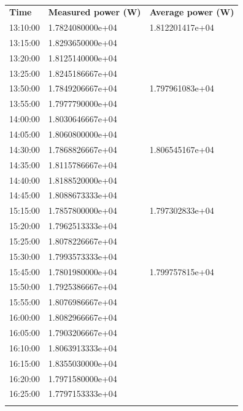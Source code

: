 \begin{table}
  \begin{center}
    \caption{}
    \label{tab:3}
    \begin{tabular}{lll}
      \hline\noalign{\smallskip}
      \textbf{Time} & \textbf{Measured power (W)} & \textbf{Average power (W)}  \\
      \noalign{\smallskip}\hline\noalign{\smallskip}
       13:10:00 & 1.7824080000e+04 & 1.812201417e+04 \\ 
       13:15:00 & 1.8293650000e+04 &  \\ 
       13:20:00 & 1.8125140000e+04 &  \\ 
       13:25:00 & 1.8245186667e+04 &  \\ 
      \noalign{\smallskip}\hline\noalign{\smallskip}
       13:50:00 & 1.7849206667e+04 & 1.797961083e+04 \\ 
       13:55:00 & 1.7977790000e+04 &  \\ 
       14:00:00 & 1.8030646667e+04 &  \\ 
       14:05:00 & 1.8060800000e+04 &  \\ 
      \noalign{\smallskip}\hline\noalign{\smallskip}
       14:30:00 & 1.7868826667e+04 & 1.806545167e+04 \\ 
       14:35:00 & 1.8115786667e+04 &  \\ 
       14:40:00 & 1.8188520000e+04 &  \\ 
       14:45:00 & 1.8088673333e+04 &  \\ 
      \noalign{\smallskip}\hline\noalign{\smallskip}
       15:15:00 & 1.7857800000e+04 & 1.797302833e+04 \\ 
       15:20:00 & 1.7962513333e+04 &  \\ 
       15:25:00 & 1.8078226667e+04 &  \\ 
       15:30:00 & 1.7993573333e+04 &  \\ 
      \noalign{\smallskip}\hline\noalign{\smallskip}
       15:45:00 & 1.7801980000e+04 & 1.799757815e+04 \\ 
       15:50:00 & 1.7925386667e+04 &  \\ 
       15:55:00 & 1.8076986667e+04 &  \\ 
       16:00:00 & 1.8082966667e+04 &  \\ 
       16:05:00 & 1.7903206667e+04 &  \\ 
       16:10:00 & 1.8063913333e+04 &  \\ 
       16:15:00 & 1.8355030000e+04 &  \\ 
       16:20:00 & 1.7971580000e+04 &  \\ 
       16:25:00 & 1.7797153333e+04 &  \\ 
      \noalign{\smallskip}\hline
    \end{tabular}
  \end{center}
\end{table}


